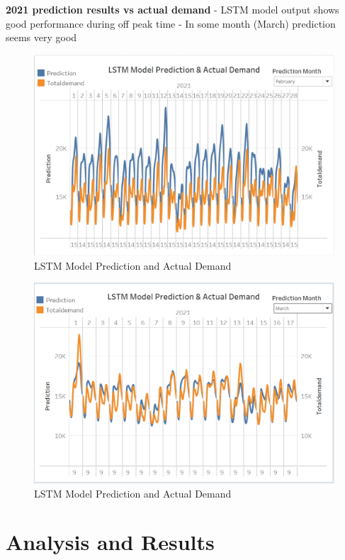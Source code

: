 \documentclass[mstat,12pt]{unswthesis}
\begin{document}
\textbf{2021 prediction results vs actual demand} \newline \newline -
LSTM model output shows good performance during off peak time \newline -
In some month (March) prediction seems very good

\begin{figure}[H]
\includegraphics{snapshots1/Slide 6 snapshot 1.png}
\caption{LSTM Model Prediction and Actual Demand}\label{4.8}
\end{figure}

\begin{figure}[H]
\includegraphics{snapshots1/Slide 6 snapshot 2.png}
\caption{LSTM Model Prediction and Actual Demand}\label{4.9}
\end{figure}

\hypertarget{analysis-and-results}{%
\chapter{Analysis and Results}\label{analysis-and-results}}
\end{document}
